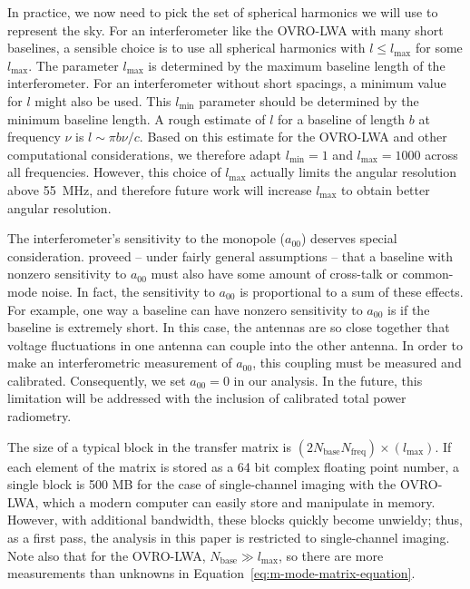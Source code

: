 \begin{bibunit}
In practice, we now need to pick the set of spherical harmonics we will use to represent the sky.
For an interferometer like the OVRO-LWA with many short baselines, a sensible choice is to use all
spherical harmonics with $l\le l_\text{max}$ for some $l_\text{max}$. The parameter $l_\text{max}$
is determined by the maximum baseline length of the interferometer.  For an interferometer without
short spacings, a minimum value for $l$ might also be used. This $l_\text{min}$ parameter should be
determined by the minimum baseline length. A rough estimate of $l$ for a baseline of length $b$ at
frequency $\nu$ is $l \sim \pi b\nu/c$. Based on this estimate for the OVRO-LWA and other
computational considerations, we therefore adapt $l_\text{min}=1$ and $l_\text{max}=1000$ across all
frequencies. However, this choice of $l_\text{max}$ actually limits the angular resolution above
55~MHz, and therefore future work will increase $l_\text{max}$ to obtain better angular resolution.

The interferometer's sensitivity to the monopole ($a_{00}$) deserves special consideration.
\citet{2016ApJ...826..116V} proveed -- under fairly general assumptions -- that a baseline with
nonzero sensitivity to $a_{00}$ must also have some amount of cross-talk or common-mode noise.  In
fact, the sensitivity to $a_{00}$ is proportional to a sum of these effects. For example, one way a
baseline can have nonzero sensitivity to $a_{00}$ is if the baseline is extremely short. In this
case, the antennas are so close together that voltage fluctuations in one antenna can couple into the
other antenna. In order to make an interferometric measurement of $a_{00}$, this coupling must be
measured and calibrated. Consequently, we set $a_{00}=0$ in our analysis. In the future, this
limitation will be addressed with the inclusion of calibrated total power radiometry.

The size of a typical block in the transfer matrix is
$(2N_\text{base}N_\text{freq})\times(l_\text{max})$. If each element of the matrix is stored as a
64 bit complex floating point number, a single block is 500 MB for the case of single-channel
imaging with the OVRO-LWA, which a modern computer can easily store and manipulate in memory.
However, with additional bandwidth, these blocks quickly become unwieldy; thus, as a first pass, the
analysis in this paper is restricted to single-channel imaging. Note also that for the OVRO-LWA,
$N_\text{base} \gg l_\text{max}$, so there are more measurements than unknowns in
Equation~\ref{eq:m-mode-matrix-equation}.


\end{bibunit}
